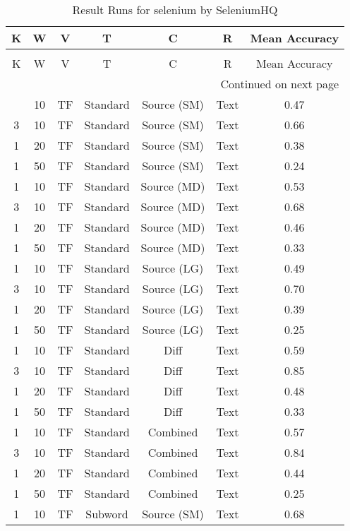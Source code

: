 \begin{longtable}{|c|c|c|c|c|c|c|}
\hline
K & W & V & T & C & R & Mean Accuracy \\
\hline
\endfirsthead
\caption[]{Continued from previous page} \\
\hline
K & W & V & T & C & R & Mean Accuracy \\
\hline
\endhead
\hline
\multicolumn{7}{r}{Continued on next page} \\
\endfoot
\hline
\caption{Result Runs for selenium by SeleniumHQ} 
\label{result-runs-selenium-seleniumhq}
\endlastfoot
1 & 10 & TF & Standard & Source (SM) & Text & 0.47 \\
\hline
3 & 10 & TF & Standard & Source (SM) & Text & 0.66 \\
\hline
1 & 20 & TF & Standard & Source (SM) & Text & 0.38 \\
\hline
1 & 50 & TF & Standard & Source (SM) & Text & 0.24 \\
\hline
1 & 10 & TF & Standard & Source (MD) & Text & 0.53 \\
\hline
3 & 10 & TF & Standard & Source (MD) & Text & 0.68 \\
\hline
1 & 20 & TF & Standard & Source (MD) & Text & 0.46 \\
\hline
1 & 50 & TF & Standard & Source (MD) & Text & 0.33 \\
\hline
1 & 10 & TF & Standard & Source (LG) & Text & 0.49 \\
\hline
3 & 10 & TF & Standard & Source (LG) & Text & 0.70 \\
\hline
1 & 20 & TF & Standard & Source (LG) & Text & 0.39 \\
\hline
1 & 50 & TF & Standard & Source (LG) & Text & 0.25 \\
\hline
1 & 10 & TF & Standard & Diff & Text & 0.59 \\
\hline
3 & 10 & TF & Standard & Diff & Text & 0.85 \\
\hline
1 & 20 & TF & Standard & Diff & Text & 0.48 \\
\hline
1 & 50 & TF & Standard & Diff & Text & 0.33 \\
\hline
1 & 10 & TF & Standard & Combined & Text & 0.57 \\
\hline
3 & 10 & TF & Standard & Combined & Text & 0.84 \\
\hline
1 & 20 & TF & Standard & Combined & Text & 0.44 \\
\hline
1 & 50 & TF & Standard & Combined & Text & 0.25 \\
\hline
1 & 10 & TF & Subword & Source (SM) & Text & 0.68 \\

\end{longtable}
